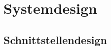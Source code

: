 \chapter{Systemdesign} %
\label{sec:systemdesign}

\section{Schnittstellendesign} %
\label{sec:schnittstellendesign}




